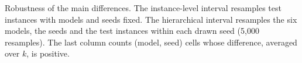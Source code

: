 \begin{table}[t]
  \centering
  \footnotesize
  \setlength{\tabcolsep}{4pt}
  
  \caption{Robustness of the main differences. The instance-level interval resamples test instances with models and seeds fixed. The hierarchical interval resamples the six models, the seeds and the test instances within each drawn seed (5,000 resamples). The last column counts (model, seed) cells whose difference, averaged over $k$, is positive.}
  \label{tab:hier}
\end{table}
